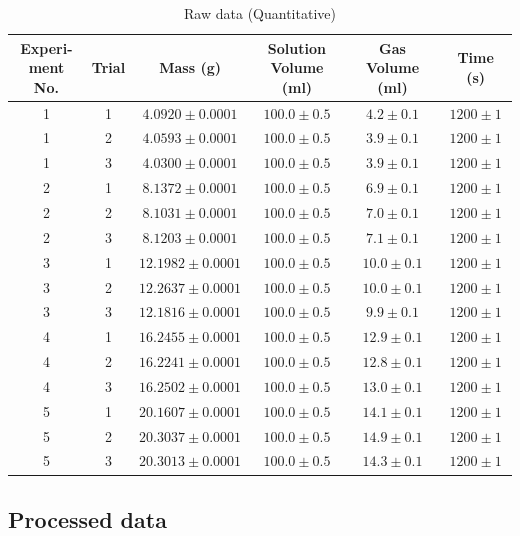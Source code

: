 \documentclass[a4paper]{article}
\begin{document}
\begin{table}[ht]
\centering
\caption{Raw data (Quantitative)}
\begin{tabular}{cccccc}
    \hline
    \makecell{Experi-\\ment No.} & Trial & {Mass (\si{\gram})} & \makecell{Solution\\ Volume (\si{\milli\litre})} & \makecell{Gas Volume\\ (\si{\milli\litre})} & {Time (\si{\second})} \\
    \hline
    1 & 1 & $4.0920 \pm 0.0001$  & $100.0 \pm 0.5$ &  $4.2 \pm 0.1$ & $1200 \pm 1$ \\
    1 & 2 & $4.0593 \pm 0.0001$  & $100.0 \pm 0.5$ &  $3.9 \pm 0.1$ & $1200 \pm 1$ \\
    1 & 3 & $4.0300 \pm 0.0001$  & $100.0 \pm 0.5$ &  $3.9 \pm 0.1$ & $1200 \pm 1$ \\
    2 & 1 & $8.1372 \pm 0.0001$  & $100.0 \pm 0.5$ &  $6.9 \pm 0.1$ & $1200 \pm 1$ \\
    2 & 2 & $8.1031 \pm 0.0001$  & $100.0 \pm 0.5$ &  $7.0 \pm 0.1$ & $1200 \pm 1$ \\
    2 & 3 & $8.1203 \pm 0.0001$  & $100.0 \pm 0.5$ &  $7.1 \pm 0.1$ & $1200 \pm 1$ \\
    3 & 1 & $12.1982 \pm 0.0001$ & $100.0 \pm 0.5$ & $10.0 \pm 0.1$ & $1200 \pm 1$ \\
    3 & 2 & $12.2637 \pm 0.0001$ & $100.0 \pm 0.5$ & $10.0 \pm 0.1$ & $1200 \pm 1$ \\
    3 & 3 & $12.1816 \pm 0.0001$ & $100.0 \pm 0.5$ & $9.9  \pm 0.1$ & $1200 \pm 1$ \\
    4 & 1 & $16.2455 \pm 0.0001$ & $100.0 \pm 0.5$ & $12.9 \pm 0.1$ & $1200 \pm 1$ \\
    4 & 2 & $16.2241 \pm 0.0001$ & $100.0 \pm 0.5$ & $12.8 \pm 0.1$ & $1200 \pm 1$ \\
    4 & 3 & $16.2502 \pm 0.0001$ & $100.0 \pm 0.5$ & $13.0 \pm 0.1$ & $1200 \pm 1$ \\
    5 & 1 & $20.1607 \pm 0.0001$ & $100.0 \pm 0.5$ & $14.1 \pm 0.1$ & $1200 \pm 1$ \\
    5 & 2 & $20.3037 \pm 0.0001$ & $100.0 \pm 0.5$ & $14.9 \pm 0.1$ & $1200 \pm 1$ \\
    5 & 3 & $20.3013 \pm 0.0001$ & $100.0 \pm 0.5$ & $14.3 \pm 0.1$ & $1200 \pm 1$ \\
    \hline
\end{tabular}
\end{table}

\subsection{Processed data}
\end{document}
